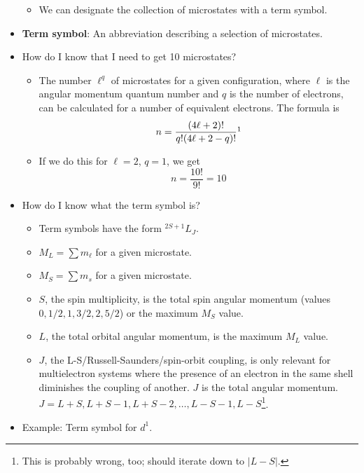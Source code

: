 \documentclass[../notes.tex]{subfiles}
\begin{document}
\begin{itemize}
\begin{itemize}
        \item We can designate the collection of microstates with a term symbol.
    \end{itemize}
    \item \textbf{Term symbol}: An abbreviation describing a selection of microstates.
    \item How do I know that I need to get 10 microstates?
    \begin{itemize}
        \item The number $\ell^q$ of microstates for a given configuration, where $\ell$ is the angular momentum quantum number and $q$ is the number of electrons, can be calculated for a number of equivalent electrons. The formula is
        \begin{equation*}
            n = \frac{(4\ell+2)!}{q!(4\ell+2-q)!}\footnotemark
        \end{equation*}
        \item If we do this for $\ell=2$, $q=1$, we get
        \begin{equation*}
            n = \frac{10!}{9!} = 10
        \end{equation*}
    \end{itemize}
    \item How do I know what the term symbol is?
    \begin{itemize}
        \item Term symbols have the form ${}^{2S+1}L_J$.
        \item $M_L=\sum m_\ell$ for a given microstate.
        \item $M_S=\sum m_s$ for a given microstate.
        \item $S$, the spin multiplicity, is the total spin angular momentum (values $0,1/2,1,3/2,2,5/2$) or the maximum $M_S$ value.
        \item $L$, the total orbital angular momentum, is the maximum $M_L$ value.
        \item $J$, the L-S/Russell-Saunders/spin-orbit coupling, is only relevant for multielectron systems where the presence of an electron in the same shell diminishes the coupling of another. $J$ is the total angular momentum. $J=L+S,L+S-1,L+S-2,\dots,L-S-1,L-S$\footnote{This is probably wrong, too; should iterate down to $|L-S|$.}.
    \end{itemize}
    \item Example: Term symbol for $d^1$.
    \begin{itemize}

\end{itemize}
\end{itemize}
\end{document}
